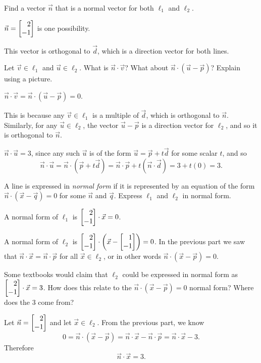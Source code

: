 	\begin{parts}
		\item Find a vector $\vec n$ that is a normal vector for both $\ell_1$
			and	$\ell_2$.
			\begin{solution}
				$\vec n=\mat{2\\-1}$ is one possibility.

				This vector is orthogonal to $\vec d$, which is a direction
				vector for both lines.
			\end{solution}
		\item Let $\vec v\in \ell_1$ and $\vec u\in \ell_2$.
			What is $\vec n\cdot \vec v$? What about $\vec n\cdot (\vec u-\vec p)$? Explain using a picture.
			\begin{solution}
				$\vec n\cdot \vec v =\vec n\cdot(\vec u-\vec p)= 0$.
				
				This is because any $\vec v \in \ell_1$ is a multiple
				of $\vec d$, which is orthogonal to $\vec n$. Similarly, for any $\vec u\in \ell_2$,
				the vector $\vec u-\vec p$ is a direction vector for $\ell_2$, and so it is orthogonal to $\vec n$.

				$\vec n\cdot \vec u=3$, since any such $\vec u$ is of the form
				$\vec u=\vec p+t\vec d$ for some scalar $t$, and so
				\[
					\vec n\cdot \vec u
					=\vec n\cdot (\vec p+t\vec d)
					=\vec n\cdot \vec p+t(\vec n\cdot \vec d)
					=3+t(0)
					=3.
				\]
			\end{solution}
		\item A line is expressed in \emph{normal form} if it is represented by
			an equation of the form $\vec n\cdot (\vec x-\vec q)=0$ for some
			$\vec n$ and $\vec q$. Express $\ell_1$ and $\ell_2$ in normal form.
			\begin{solution}
				A normal form of $\ell_1$ is $\mat{2\\-1}\cdot\vec x=0$.

				A normal form of $\ell_2$ is $\mat{2\\-1}\cdot\left(\vec x-\mat{1\\-1}\right)=0$.
				In the previous part we saw that $\vec n\cdot \vec x=\vec n\cdot \vec p$
				for all $\vec x\in \ell_2$, or in other words $\vec n\cdot (\vec x-\vec p) = 0$.
			\end{solution}
		\item Some textbooks would claim that $\ell_2$ could be expressed in normal form as {\color{cyan}$\mat{2\\-1}\cdot \vec x=3$}.
			How does this relate to the $\vec n\cdot(\vec x-\vec p)=0$ normal form? Where does the $3$ come from?
			\begin{solution}
				Let $\vec n=\mat{2\\-1}$ and let $\vec x\in \ell_2$. From the previous part, we know
				\[
					0=\vec n\cdot (\vec x-\vec p)
					=\vec n\cdot \vec x-\vec n\cdot \vec p
					=\vec n\cdot \vec x-3.
				\]
				Therefore
				\[
					\vec n\cdot \vec x= 3.
				\]
			\end{solution}
	\end{parts}

